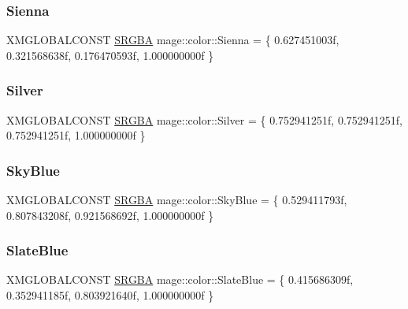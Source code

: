\hypertarget{namespacemage_1_1color_a27eddb02f837f52a00386e4333e5eb85}{}\label{namespacemage_1_1color_a27eddb02f837f52a00386e4333e5eb85} 
\subsubsection{\texorpdfstring{Sienna}{Sienna}}
{\footnotesize\ttfamily X\+M\+G\+L\+O\+B\+A\+L\+C\+O\+N\+ST \hyperlink{structmage_1_1_s_r_g_b_a}{S\+R\+G\+BA} mage\+::color\+::\+Sienna = \{ 0.\+627451003f, 0.\+321568638f, 0.\+176470593f, 1.\+000000000f \}}

\hypertarget{namespacemage_1_1color_acebb20ebe9cd29655857f24b697a30b9}{}\label{namespacemage_1_1color_acebb20ebe9cd29655857f24b697a30b9} 
\subsubsection{\texorpdfstring{Silver}{Silver}}
{\footnotesize\ttfamily X\+M\+G\+L\+O\+B\+A\+L\+C\+O\+N\+ST \hyperlink{structmage_1_1_s_r_g_b_a}{S\+R\+G\+BA} mage\+::color\+::\+Silver = \{ 0.\+752941251f, 0.\+752941251f, 0.\+752941251f, 1.\+000000000f \}}

\hypertarget{namespacemage_1_1color_a59cad81a80e8dce3541dd54e603cb63c}{}\label{namespacemage_1_1color_a59cad81a80e8dce3541dd54e603cb63c} 
\subsubsection{\texorpdfstring{Sky\+Blue}{SkyBlue}}
{\footnotesize\ttfamily X\+M\+G\+L\+O\+B\+A\+L\+C\+O\+N\+ST \hyperlink{structmage_1_1_s_r_g_b_a}{S\+R\+G\+BA} mage\+::color\+::\+Sky\+Blue = \{ 0.\+529411793f, 0.\+807843208f, 0.\+921568692f, 1.\+000000000f \}}

\hypertarget{namespacemage_1_1color_a604b4410edf3b2bda414691b3bb877c2}{}\label{namespacemage_1_1color_a604b4410edf3b2bda414691b3bb877c2} 
\subsubsection{\texorpdfstring{Slate\+Blue}{SlateBlue}}
{\footnotesize\ttfamily X\+M\+G\+L\+O\+B\+A\+L\+C\+O\+N\+ST \hyperlink{structmage_1_1_s_r_g_b_a}{S\+R\+G\+BA} mage\+::color\+::\+Slate\+Blue = \{ 0.\+415686309f, 0.\+352941185f, 0.\+803921640f, 1.\+000000000f \}}

